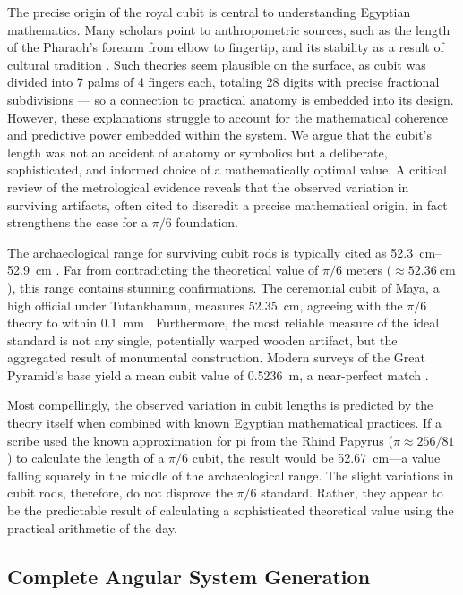 \documentclass[11pt]{article}
\begin{document}
The precise origin of the royal cubit is central to understanding Egyptian mathematics. Many scholars point to anthropometric sources, such as the length of the Pharaoh's forearm from elbow to fingertip, and its stability as a result of cultural tradition \cite{stone2014cubit, imhausen2016mathematics}. Such theories seem plausible on the surface, as cubit was divided into 7 palms of 4 fingers each, totaling 28 digits with precise fractional subdivisions — so a connection to practical anatomy is embedded into its design. However, these explanations struggle to account for the mathematical coherence and predictive power embedded within the system. We argue that the cubit's length was not an accident of anatomy or symbolics but a deliberate, sophisticated, and informed choice of a mathematically optimal value. A critical review of the metrological evidence reveals that the observed variation in surviving artifacts, often cited to discredit a precise mathematical origin, in fact strengthens the case for a $\pi/6$ foundation.

The archaeological range for surviving cubit rods is typically cited as \SIrange{52.3}{52.9}{\centi\meter} \cite{lepsius1865altagyptische}. Far from contradicting the theoretical value of $\pi/6$ meters ($\approx\SI{52.36}{\centi\meter}$), this range contains stunning confirmations. The ceremonial cubit of Maya, a high official under Tutankhamun, measures \SI{52.35}{\centi\meter}, agreeing with the $\pi/6$ theory to within \SI{0.1}{\milli\meter} \cite{imhausen2016mathematics}. Furthermore, the most reliable measure of the ideal standard is not any single, potentially warped wooden artifact, but the aggregated result of monumental construction. Modern surveys of the Great Pyramid's base yield a mean cubit value of \SI{0.5236}{\meter}, a near-perfect match \cite{dash2015survey}.

Most compellingly, the observed variation in cubit lengths is predicted by the theory itself when combined with known Egyptian mathematical practices. If a scribe used the known approximation for pi from the Rhind Papyrus ($\pi \approx 256/81$) to calculate the length of a $\pi/6$ cubit, the result would be \SI{52.67}{\centi\meter}---a value falling squarely in the middle of the archaeological range. The slight variations in cubit rods, therefore, do not disprove the $\pi/6$ standard. Rather, they appear to be the predictable result of calculating a sophisticated theoretical value using the practical arithmetic of the day.

\subsection{Complete Angular System Generation}
\end{document}
